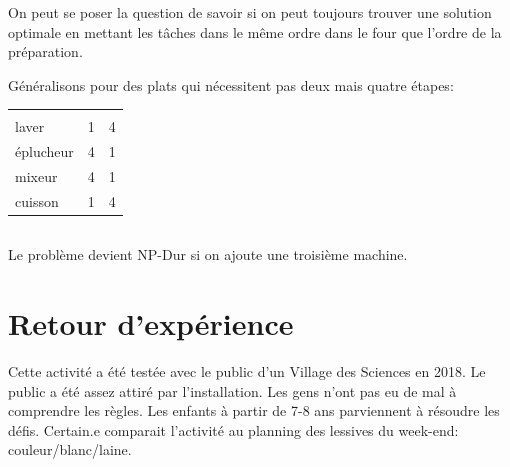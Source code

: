 \documentclass[a4paper]{article}
\begin{document}
On peut se poser la question de savoir si on peut toujours trouver une solution optimale en mettant les tâches dans le même ordre dans le four que l'ordre de la préparation.

Généralisons pour des plats qui nécessitent pas deux mais quatre étapes:\\
\begin{tabular}{lll}
          &   & \\
laver  & 1 & 4 \\  
éplucheur    & 4 & 1 \\
mixeur & 4 & 1 \\
cuisson      & 1 & 4 \\
\end{tabular}

\subsection{}

Le problème devient NP-Dur si on ajoute une troisième machine\cite{baker2013principles}.

\section{Retour d'expérience}

Cette activité a été testée avec le public d'un Village des Sciences en 2018. Le public a été assez attiré par l'installation. Les gens n'ont pas eu de mal à comprendre les règles. Les enfants à partir de 7-8 ans parviennent à résoudre les défis. Certain.e comparait l'activité au planning des lessives du week-end: couleur/blanc/laine. 
\end{document}
